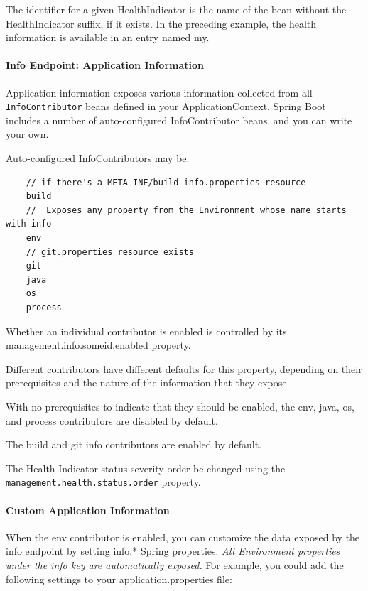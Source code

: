 \documentclass{scrartcl}
\begin{document}
The identifier for a given HealthIndicator is the name of the bean without the HealthIndicator suffix, if it exists. In the preceding example, the health information is available in an entry named my.

\paragraph{Info Endpoint: Application Information}

Application information exposes various information collected from all \lstinline|InfoContributor| beans defined in your ApplicationContext. Spring Boot includes a number of auto-configured InfoContributor beans, and you can write your own.

Auto-configured InfoContributors may be:

\begin{lstlisting}
    // if there's a META-INF/build-info.properties resource
    build
    //  Exposes any property from the Environment whose name starts with info
    env
    // git.properties resource exists
    git
    java
    os
    process
\end{lstlisting}

Whether an individual contributor is enabled is controlled by its management.info.someid.enabled property.

Different contributors have different defaults for this property, depending on their prerequisites and the nature of the information that they expose.

With no prerequisites to indicate that they should be enabled, the env, java, os, and process contributors are disabled by default.

The build and git info contributors are enabled by default.

The Health Indicator status severity order be changed using the \lstinline|management.health.status.order| property.

\paragraph{Custom Application Information}

When the env contributor is enabled, you can customize the data exposed by the info endpoint by setting info.* Spring properties. \textit{All Environment properties under the info key are automatically exposed.} For example, you could add the following settings to your application.properties file:
\end{document}
